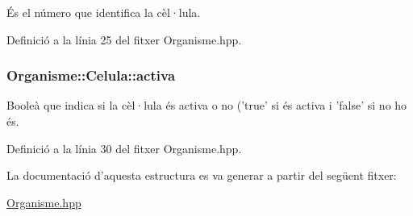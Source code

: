 És el número que identifica la cèl·lula. 



Definició a la línia 25 del fitxer Organisme.\-hpp.

\hypertarget{struct_organisme_1_1_celula_ae76b8fe2263311c1a52e4fba8f649114}{
\subsubsection[{activa}]{\setlength{\rightskip}{0pt plus 5cm}Organisme\-::\-Celula\-::activa}}\label{struct_organisme_1_1_celula_ae76b8fe2263311c1a52e4fba8f649114}


Booleà que indica si la cèl·lula és activa o no ('true' si és activa i 'false' si no ho és. 



Definició a la línia 30 del fitxer Organisme.\-hpp.



La documentació d'aquesta estructura es va generar a partir del següent fitxer\-:\begin{DoxyCompactItemize}
\item 
\hyperlink{_organisme_8hpp}{Organisme.\-hpp}\end{DoxyCompactItemize}
